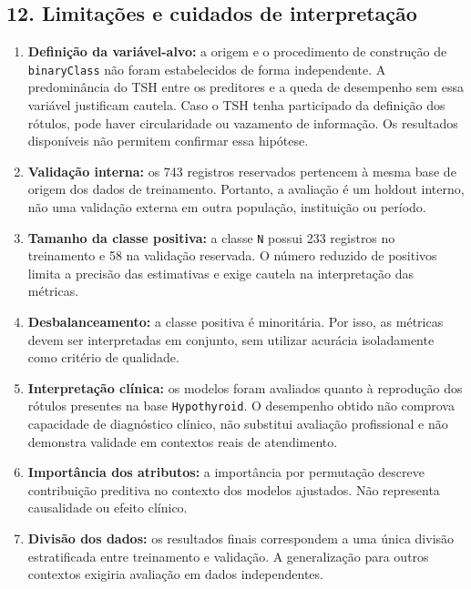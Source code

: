 \documentclass[
]{article}
\providecommand{\tightlist}{%
  \setlength{\itemsep}{0pt}\setlength{\parskip}{0pt}}
\begin{document}
\hypertarget{limitauxe7uxf5es-e-cuidados-de-interpretauxe7uxe3o}{%
\subsection{12. Limitações e cuidados de
interpretação}\label{limitauxe7uxf5es-e-cuidados-de-interpretauxe7uxe3o}}

\begin{enumerate}
\def\labelenumi{\arabic{enumi}.}
\tightlist
\item
  \textbf{Definição da variável-alvo:} a origem e o procedimento de
  construção de \texttt{binaryClass} não foram estabelecidos de forma
  independente. A predominância do TSH entre os preditores e a queda de
  desempenho sem essa variável justificam cautela. Caso o TSH tenha
  participado da definição dos rótulos, pode haver circularidade ou
  vazamento de informação. Os resultados disponíveis não permitem
  confirmar essa hipótese.
\item
  \textbf{Validação interna:} os 743 registros reservados pertencem à
  mesma base de origem dos dados de treinamento. Portanto, a avaliação é
  um holdout interno, não uma validação externa em outra população,
  instituição ou período.
\item
  \textbf{Tamanho da classe positiva:} a classe \texttt{N} possui 233
  registros no treinamento e 58 na validação reservada. O número
  reduzido de positivos limita a precisão das estimativas e exige
  cautela na interpretação das métricas.
\item
  \textbf{Desbalanceamento:} a classe positiva é minoritária. Por isso,
  as métricas devem ser interpretadas em conjunto, sem utilizar acurácia
  isoladamente como critério de qualidade.
\item
  \textbf{Interpretação clínica:} os modelos foram avaliados quanto à
  reprodução dos rótulos presentes na base \texttt{Hypothyroid}. O
  desempenho obtido não comprova capacidade de diagnóstico clínico, não
  substitui avaliação profissional e não demonstra validade em contextos
  reais de atendimento.
\item
  \textbf{Importância dos atributos:} a importância por permutação
  descreve contribuição preditiva no contexto dos modelos ajustados. Não
  representa causalidade ou efeito clínico.
\item
  \textbf{Divisão dos dados:} os resultados finais correspondem a uma
  única divisão estratificada entre treinamento e validação. A
  generalização para outros contextos exigiria avaliação em dados
  independentes.
\end{enumerate}
\end{document}
